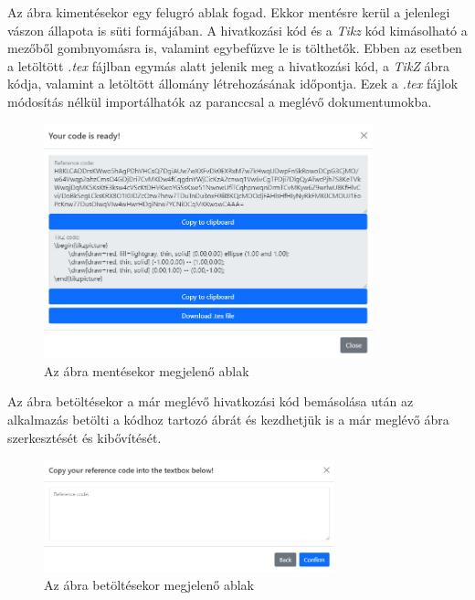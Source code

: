 Az ábra kimentésekor egy felugró ablak fogad. Ekkor mentésre kerül a jelenlegi vászon állapota is süti formájában. A hivatkozási kód és a \textit{Tikz} kód kimásolható a mezőből gombnyomásra is, valamint egybefűzve le is tölthetők. Ebben az esetben a letöltött \textit{.tex} fájlban egymás alatt jelenik meg a hivatkozási kód, a \textit{TikZ} ábra kódja, valamint a letöltött állomány létrehozásának időpontja. Ezek a \textit{.tex} fájlok módosítás nélkül importálhatók az \lstinline[style=latex]{} paranccsal a meglévő dokumentumokba. 

\begin{figure}[!h]
	\label{fig:load}
	\centering
	\includegraphics[width=0.85\textwidth]{images/save_modal.png}
	\caption{Az ábra mentésekor megjelenő ablak}
\end{figure}

Az ábra betöltésekor a már meglévő hivatkozási kód bemásolása után az alkalmazás betölti a kódhoz tartozó ábrát és kezdhetjük is a már meglévő ábra szerkesztését és kibővítését.

\begin{figure}[!h]
	\label{fig:save}
	\centering
	\includegraphics[width=0.75\textwidth]{images/load_modal.png}
	\caption{Az ábra betöltésekor megjelenő ablak}
\end{figure}


